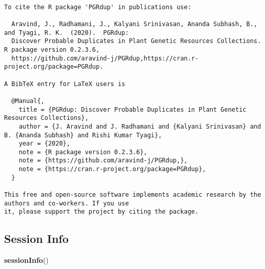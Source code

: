 \documentclass[
]{article}
\newenvironment{Shaded}{\begin{snugshade}}{\end{snugshade}}
\newcommand{\KeywordTok}[1]{\textcolor[rgb]{0.13,0.29,0.53}{\textbf{#1}}}
\newcommand{\NormalTok}[1]{#1}
\begin{document}
\begin{verbatim}

To cite the R package 'PGRdup' in publications use:

  Aravind, J., Radhamani, J., Kalyani Srinivasan, Ananda Subhash, B., and Tyagi, R. K.  (2020).  PGRdup:
  Discover Probable Duplicates in Plant Genetic Resources Collections. R package version 0.2.3.6,
  https://github.com/aravind-j/PGRdup,https://cran.r-project.org/package=PGRdup.

A BibTeX entry for LaTeX users is

  @Manual{,
    title = {PGRdup: Discover Probable Duplicates in Plant Genetic Resources Collections},
    author = {J. Aravind and J. Radhamani and {Kalyani Srinivasan} and B. {Ananda Subhash} and Rishi Kumar Tyagi},
    year = {2020},
    note = {R package version 0.2.3.6},
    note = {https://github.com/aravind-j/PGRdup,},
    note = {https://cran.r-project.org/package=PGRdup},
  }

This free and open-source software implements academic research by the authors and co-workers. If you use
it, please support the project by citing the package.
\end{verbatim}

\hypertarget{session-info}{%
\subsection{Session Info}\label{session-info}}

\begin{Shaded}
\begin{Highlighting}[]
\KeywordTok{sessionInfo}\NormalTok{()}
\end{Highlighting}
\end{Shaded}
\end{document}
